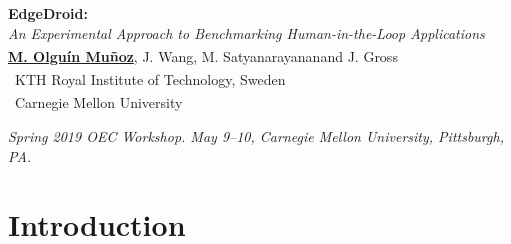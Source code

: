 \documentclass[aspectratio=1610]{beamer}
\newcommand{\kthaffil}{\textsuperscript{\textdagger}}
\newcommand{\cmuaffil}{\textsuperscript{\textdaggerdbl}}
\begin{document}
\startpage
\begin{frame}{}
    \begin{raggedright}
        {\bfseries\LARGE EdgeDroid:}\\\emph{An Experimental Approach to Benchmarking Human-in-the-Loop Applications}\\
        \vspace{0.06\textheight}
        {%
            \footnotesize%
            \underline{\bfseries M. Olguín Muñoz}\kthaffil, J. Wang\cmuaffil, M. Satyanarayanan\cmuaffil and J. Gross\kthaffil\\
            \vspace{0.02\textheight}
            \kthaffil~KTH Royal Institute of Technology, Sweden\\
            \cmuaffil~Carnegie Mellon University\\
        }
        \vspace{0.06\textheight}
        \begin{tiny}
            \emph{Spring 2019 OEC Workshop. May 9--10, Carnegie Mellon University, Pittsburgh, PA.}\\
        \end{tiny}
    \end{raggedright}
\end{frame}

\normalpage%
\section{Introduction}
\begin{frame}{}
    \begin{center}
        \\
    \end{center}
\end{frame}
\end{document}
